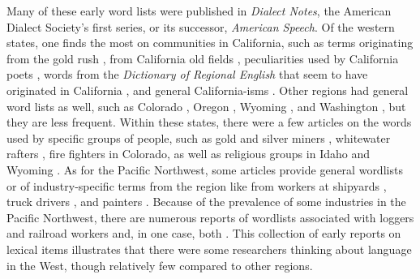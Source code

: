 Many of these early word lists were published in \textit{Dialect Notes}, the American Dialect Society's first series, or its successor, \textit{American Speech}. Of the western states, one finds the most on communities in California, such as terms originating from the gold rush \citep{hamilton_1932, moore_1926}, from California old fields \citep{pond_1932}, peculiarities used by California poets \citep{grant_1942}, words from the \textit{Dictionary of Regional English} that seem to have originated in California \citep{shulman_1949}, and general California-isms \citep{lehman_1921, watkins_mulhall_1951}. Other regions had general word lists as well, such as Colorado \citep{davidson_koehler_1932}, Oregon \citep{hausen_1931}, Wyoming \citep{clough_1936, clough_1954}, and Washington \citep{adams_1958}, but they are less frequent. Within these states, there were a few articles on the words used by specific groups of people, such as gold and silver miners \citep{davidson_1929}, whitewater rafters \citep{akin_goltry_1969}, fire fighters \citep{yelsma_1969} in Colorado, as well as religious groups in Idaho and Wyoming \citep{jensen_1931, lindsay_1933}. As for the Pacific Northwest, some articles provide general wordlists \citep{harvey_1914_part1, harvey_1914_part2, finder_1965} or of industry-specific terms from the region like from workers at shipyards \citep{babbitt_1944}, truck drivers \citep{hanley_1961}, and painters \citep{hines_1969}. Because of the prevalence of some industries in the Pacific Northwest, there are numerous reports of wordlists associated with loggers \citep{stevens_1925, davis_1942, davis_1950, carranco_1956, mcculloch_1958} and railroad workers \citep{batie_1934, schultz_1937, snapp_logan_1938, cottrell_montgomery_1943} and, in one case, both \citep{carranco_1962}. This collection of early reports on lexical items illustrates that there were some researchers thinking about language in the West, though relatively few compared to other regions.

